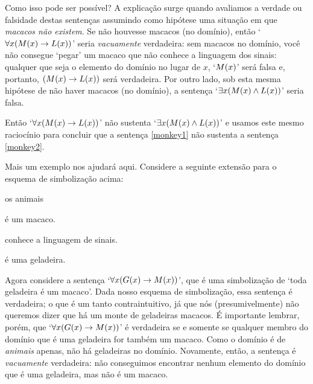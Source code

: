 Como isso pode ser possível?
A explicação surge quando avaliamos a verdade ou falsidade destas sentenças assumindo como hipótese uma situação em que \emph{macacos não existem}.
Se não houvesse macacos (no domínio), então `$\forall x(\mathord{M}(x) \rightarrow \mathord{L}(x))$' seria \emph{vacuamente} verdadeira:
sem macacos no domínio, você não consegue `pegar' um macaco que não conhece a linguagem dos sinais: qualquer que seja o elemento do domínio no lugar de $x$, `$\mathord{M}(x)$' será falsa e, portanto, $(\mathord{M}(x) \rightarrow \mathord{L}(x))$ será verdadeira.
Por outro lado, sob esta mesma hipótese de não haver macacos (no domínio), a sentença `$\exists x(\mathord{M}(x) \wedge \mathord{L}(x))$' seria falsa.

Então `$\forall x(\mathord{M}(x) \rightarrow \mathord{L}(x))$' não sustenta `$\exists x(\mathord{M}(x) \wedge \mathord{L}(x))$' e usamos este mesmo raciocínio para concluir que a sentença \ref{monkey1} não sustenta a sentença \ref{monkey2}.

Mais um exemplo nos ajudará aqui.
Considere a seguinte extensão para o esquema de simbolização acima:
		\begin{center}
		\begin{ekey}
			\item[\text{domínio}] os animais
			\item[\atom{M}{x}]  é um macaco.
			\item[\atom{L}{x}]  conhece a linguagem de sinais.
			\item[\atom{G}{x}]  é uma geladeira.
		\end{ekey}
		\end{center}
Agora considere a sentença `$\forall x(\mathord{G}(x) \rightarrow \mathord{M}(x))$', que é uma simbolização de `toda geladeira é um macaco'.
Dada nosso esquema de simbolização, essa sentença é verdadeira; o que é um tanto contraintuitivo, já que nós (presumivelmente) não queremos dizer que há um monte de geladeiras macacos.
É importante lembrar, porém, que `$\forall x(\mathord{G}(x) \rightarrow \mathord{M}(x))$' é verdadeira se e somente se qualquer membro do domínio que é uma geladeira for também um macaco.
Como o domínio é de \emph{animais} apenas, não há geladeiras no domínio. Novamente, então, a sentença é \emph{vacuamente} verdadeira:
não conseguimos encontrar nenhum elemento do domínio que é uma geladeira, mas não é um macaco. 

